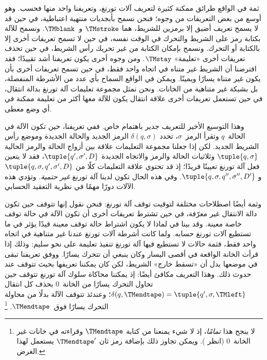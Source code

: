 \documentclass[../../../include/open-logic-section]{subfiles}
\begin{document}

ثمة في الواقع طرائق ممكنة كثيرة لتعريف آلات تورنغ، وتعريفنا واحد منها
فحسب. وهو أوسع من بعض التعريفات من وجوه؛ فنحن نسمح بأبجديات منتهية
اعتباطية، في حين قد لا يسمح تعريف أضيق إلا برمزين للشريط، هما
$\TMstroke$ و~$\TMblank$. ونسمح للآلة بكتابة رمز على الشريط والتحرك
في الوقت نفسه، في حين لا تسمح تعريفات أخرى إلا بالكتابة أو التحرك.
ونسمح بإمكان الكتابة من غير تحريك رأس الشريط، في حين تحذف تعريفات
أخرى «تعليمة» $\TMstay$. ومن وجوه أخرى يكون تعريفنا أشد تقييدًا؛ فقد
افترضنا أن الشريط غير متناه في اتجاه واحد فقط، في حين تسمح تعريفات
أخرى بأن يكون غير متناه يسارًا ويمينًا. ويمكن في الواقع السماح بأي
عدد من الأشرطة المنفصلة، بل بشبكة غير متناهية من الخانات. ونحن نمثل
مجموعة تعليمات آلة تورنغ بدالة انتقال، في حين تستعمل تعريفات أخرى
علاقة انتقال يكون للآلة معها أكثر من تعليمة ممكنة في أي وضع معطى.

وهذا التوسيع الأخير للتعريف جدير باهتمام خاص. ففي تعريفنا، حين تكون
الآلة في الحالة~$q$ وتقرأ الرمز~$\sigma$، تحدد
$\delta(q,\sigma)$ الرمز الجديد والحالة الجديدة وموضع رأس الشريط
الجديد. لكن إذا جعلنا مجموعة التعليمات علاقة بين أزواج الحالة والرمز
الحالية $\tuple{q,\sigma}$ وثلاثيات الحالة والرمز والاتجاه الجديدة
$\tuple{q',\sigma',D}$، فقد لا يتعين فعل آلة تورنغ تعيينًا فريدًا؛ إذ
قد تحتوي علاقة التعليمات كلًا من
$\tuple{q,\sigma,q',\sigma',D}$ و
$\tuple{q,\sigma,q'',\sigma'',D'}$. وفي هذه الحال تكون لدينا آلة
تورنغ \emph{غير حتمية}. وتؤدي هذه الآلات دورًا مهمًا في نظرية التعقيد
الحسابي.

وثمة أيضًا اصطلاحات مختلفة لتوقيت توقف آلة تورنغ: فنحن نقول إنها
تتوقف حين تكون دالة الانتقال غير معرّفة، في حين تشترط تعريفات أخرى
أن تكون الآلة في حالة توقف خاصة معينة. وقد بينا في
 لماذا لا يكون اشتراط حالة توقف معينة قيدًا يؤثر في
ما تستطيع آلات تورنغ حسابه. ولما كانت أشرطة آلات تورنغ عندنا غير
متناهية في اتجاه واحد فقط، فثمة حالات لا تستطيع فيها آلة تورنغ تنفيذ
تعليمة على نحو سليم: وذلك إذا قرأت الخانة الواقعة في أقصى اليسار وكان
ينبغي أن تتحرك يسارًا. ووفق تعريفنا تبقى في موضعها بدل أن «تسقط خارج»
الشريط، لكن كان يمكننا تعريفها بحيث تتوقف عند حدوث ذلك. وهذا التعريف
مكافئ أيضًا: إذ يمكننا محاكاة سلوك آلة تورنغ تتوقف حين تحاول التحرك
يسارًا من الخانة~$0$ بحذف كل انتقال
$\delta(q,\TMendtape)=\tuple{q',\sigma,\TMleft}$؛ وعندئذ تتوقف الآلة
بدلًا من محاولة التحرك يسارًا فوق~$\TMendtape$.
\footnote{لا ينجح هذا \emph{تمامًا}، إذ لا شيء يمنعنا من كتابة
$\TMendtape$ وقراءته في خانات غير الخانة~$0$ (انظر
). ويمكن تجاوز ذلك بإضافة رمز ثان
$\TMendtape'$ يستعمل لهذا الغرض.}
\end{document}
